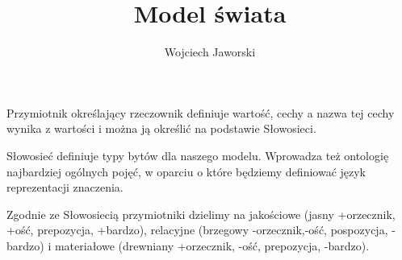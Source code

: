 \documentclass[a4paper,12pt]{article}
\title{Model świata}
\author{Wojciech Jaworski}
\date{}
\begin{document}
\maketitle

Przymiotnik określający rzeczownik definiuje wartość, cechy a nazwa tej cechy wynika 
z wartości i można ją określić na podstawie Słowosieci.

Słowosieć definiuje typy bytów dla naszego modelu. 
Wprowadza też ontologię najbardziej ogólnych pojęć, 
w oparciu o które będziemy definiować język reprezentacji znaczenia.

Zgodnie ze Słowosiecią 
przymiotniki dzielimy na 
jakościowe (jasny +orzecznik, +ość, prepozycja, +bardzo), relacyjne (brzegowy -orzecznik,-ość, pospozycja, -bardzo) i materiałowe (drewniany +orzecznik, -ość, prepozycja, -bardzo).
\end{document}
